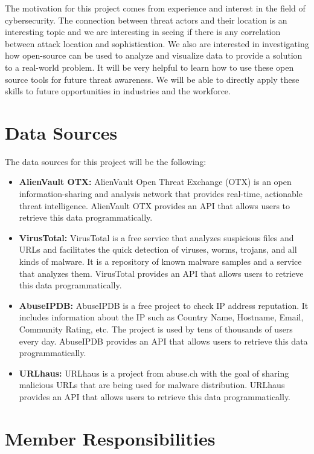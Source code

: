 \documentclass[letterpaper, 10 pt, conference]{ieeeconf}  %
\begin{document}
The motivation for this project comes from experience and interest in the field of cybersecurity. 
The connection between threat actors and their location is an interesting topic and we are interesting in seeing if there is any correlation between attack location and sophistication. 
We also are interested in investigating how open-source can be used to analyze and visualize data to provide a solution to a real-world problem. It will be very helpful to learn how to use these open source tools for future threat awareness. We will be able to directly apply these skills to future opportunities in industries and the workforce.

\section{Data Sources}

The data sources for this project will be the following:
\begin{itemize}
    \item \textbf{AlienVault OTX:} AlienVault Open Threat Exchange (OTX) is an open information-sharing and analysis network that provides real-time, actionable threat intelligence. AlienVault OTX provides an API that allows users to retrieve this data programmatically. 
    \item \textbf{VirusTotal:} VirusTotal is a free service that analyzes suspicious files and URLs and facilitates the quick detection of viruses, worms, trojans, and all kinds of malware. It is a repository of known malware samples and a service that analyzes them. VirusTotal provides an API that allows users to retrieve this data programmatically.
    \item \textbf{AbuseIPDB:} AbuseIPDB is a free project to check IP address reputation. It includes information about the IP such as Country Name, Hostname, Email, Community Rating, etc. The project is used by tens of thousands of users every day. AbuseIPDB provides an API that allows users to retrieve this data programmatically.
    \item \textbf{URLhaus:} URLhaus is a project from abuse.ch with the goal of sharing malicious URLs that are being used for malware distribution. URLhaus provides an API that allows users to retrieve this data programmatically.
\end{itemize}

\section{Member Responsibilities}
\end{document}

